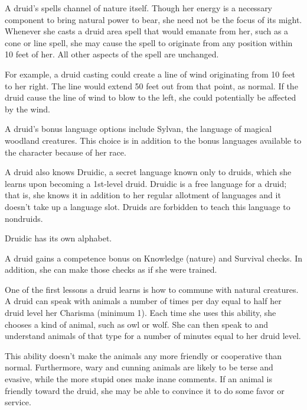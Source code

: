 
 A druid's spells channel of nature itself. Though her energy is a necessary component to bring natural power to bear, she need not be the focus of its might. Whenever she casts a druid area spell that would emanate from her, such as a cone or line spell, she may cause the spell to originate from any position within 10 feet of her. All other aspects of the spell are unchanged.

For example, a druid casting  could create a line of wind originating from 10 feet to her right. The line would extend 50 feet out from that point, as normal. If the druid cause the line of wind to blow to the left, she could potentially be affected by the wind.

 A druid's bonus language options include Sylvan, the language of magical woodland creatures. This choice is in addition to the bonus languages available to the character because of her race.

A druid also knows Druidic, a secret language known only to druids, which she learns upon becoming a 1st-level druid. Druidic is a free language for a druid; that is, she knows it in addition to her regular allotment of languages and it doesn't take up a language slot. Druids are forbidden to teach this language to nondruids.

Druidic has its own alphabet.

 A druid gains a  competence bonus on Knowledge (nature) and Survival checks. In addition, she can make those checks as if she were trained.

 One of the first lessons a druid learns is how to commune with natural creatures. A druid can speak with animals a number of times per day equal to half her druid level \add her Charisma (minimum 1). Each time she uses this ability, she chooses a kind of animal, such as owl or wolf. She can then speak to and understand animals of that type for a number of minutes equal to her druid level.

This ability doesn't make the animals any more friendly or cooperative than normal. Furthermore, wary and cunning animals are likely to be terse and evasive, while the more stupid ones make inane comments. If an animal is friendly toward the druid, she may be able to convince it to do some favor or service.

